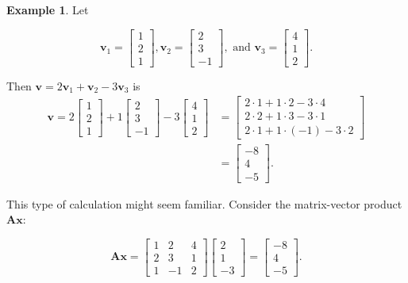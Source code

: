 \documentclass[
]{book}
\theoremstyle{definition}
\theoremstyle{definition}
\newtheorem{example}{Example}[chapter]
\theoremstyle{definition}
\theoremstyle{definition}
\theoremstyle{remark}
\begin{document}
\begin{examplebox}

\begin{example}
Let

\[\mathbf{v}_1=\begin{bmatrix} 1\\2\\1\end{bmatrix},\mathbf{v}_2=\begin{bmatrix} 2\\3\\-1\end{bmatrix}, \text{ and }\mathbf{v}_3=\begin{bmatrix}4\\1\\2\end{bmatrix}.\]

Then \(\mathbf{v}=2\mathbf{v}_1+\mathbf{v}_2-3\mathbf{v}_3\) is
\begin{align*}\mathbf{v}=2\begin{bmatrix} 1\\2\\1\end{bmatrix}+1\begin{bmatrix} 2\\3\\-1\end{bmatrix}-3\begin{bmatrix}4\\1\\2\end{bmatrix}&=\begin{bmatrix}2\cdot 1+1\cdot 2-3\cdot 4\\2\cdot 2+1\cdot 3-3\cdot 1\\2\cdot 1+1\cdot(-1)-3\cdot 2\end{bmatrix}\\
&=\begin{bmatrix}-8\\4\\-5\end{bmatrix}.
\end{align*}
\end{example}

\end{examplebox}

This type of calculation might seem familiar. Consider the matrix-vector product \(\mathbf{A}\mathbf{x}\):

\[\mathbf{A}\mathbf{x}=\begin{bmatrix}1 & 2 & 4\\2 & 3 & 1\\1 & -1 & 2\end{bmatrix}\begin{bmatrix}2\\1\\-3\end{bmatrix}=\begin{bmatrix}-8\\4\\-5\end{bmatrix}.\]
\end{document}
